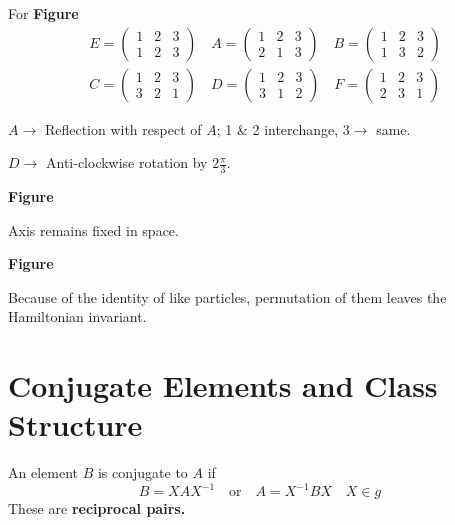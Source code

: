 \begin{example*}
For {\bf Figure}
\begin{align*}
& E=\left(\begin{matrix} 1 & 2 & 3\\ 1 & 2 & 3\end{matrix}\right)\quad A=\left(\begin{matrix} 1 & 2 & 3\\ 2 & 1 & 3\end{matrix}\right)\quad B=\left(\begin{matrix} 1 & 2 & 3\\ 1 & 3 & 2\end{matrix}\right)\\[5pt]
& C=\left(\begin{matrix} 1 & 2 & 3\\ 3 & 2 & 1\end{matrix}\right)\quad D=\left(\begin{matrix} 1 & 2 & 3\\ 3 & 1 & 2\end{matrix}\right)\quad F=\left(\begin{matrix} 1 & 2 & 3\\ 2 & 3 & 1\end{matrix}\right)
\end{align*}

$A \to$ Reflection with respect of $A$; 1 \& 2 interchange, $3\to$ same.

$D\to$ Anti-clockwise rotation by $2\frac{\pi}{3}$.
\begin{center}
{\bf Figure}
\end{center}
Axis remains fixed in space.
\begin{center}
{\bf Figure}
\end{center}

Because of the identity of like particles, permutation of them leaves the Hamiltonian invariant.
\end{example*}

\section*{Conjugate Elements and Class Structure}

An element $B$ is conjugate to $A$ if
$$
B=XAX^{-1}\quad\text{or}\quad A=X^{-1}BX\quad X\in g
$$
These are {\bf reciprocal pairs.}

